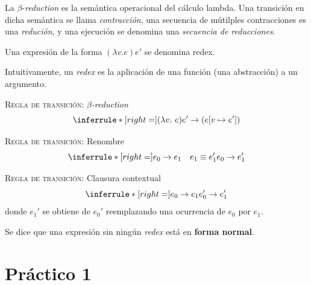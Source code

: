\documentclass[article, 12pt]{article}
\begin{document}
La $\beta$-\textit{reduction} es la semántica operacional del cálculo lambda.
Una transición en dicha semántica se llama \textit{contracción}, una secuencia
de mútilples contracciones es una \textit{redución}, y una ejecución se denomina
una \textit{secuencia de reducciones}.

\begin{definition}
  Una expresión de la forma $(\lambda v. e)e'$ se denomina redex.
\end{definition}

Intuitivamente, un \textit{redex} es la aplicación de una función (una
abstracción) a un argumento.

\textsc{Regla de transición:} $\beta$\textit{-reduction}
\[
\inferrule* [right=] {}{(\lambda v.\ e)e' \to (e[v \mapsto e'])}
\]

\textsc{Regla de transición:} Renombre
\[
\inferrule* [right=] {e_0 \to e_1 \quad e_1 \equiv e_1'}{e_0 \to e_1'}
\]

\textsc{Regla de transición:} Clausura contextual
\[
\inferrule* [right=] {e_0 \to e_1}{e_0' \to e_1'}
\]
donde $e_1'$ se obtiene de $e_0'$ reemplazando una ocurrencia de $e_0$ por
$e_1$.

\begin{definition}
  Se dice que una expresión sin ningún \textit{redex} está en \textbf{forma
  normal}.
\end{definition}
















\pagebreak
\section{Práctico 1}
\end{document}
